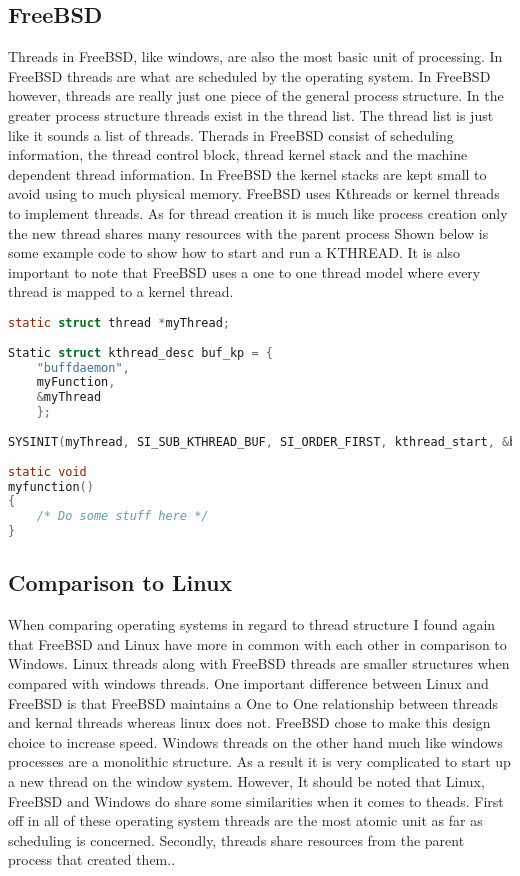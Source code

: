 \documentclass[letterpaper, onecolumn,10pt]{IEEEtran}
\begin{document}
			\subsection{FreeBSD}
			Threads in FreeBSD, like windows, are also the most basic unit of processing. In FreeBSD threads are what are scheduled by the operating system. In FreeBSD however, threads are really just one piece of the general process structure. In the greater process structure threads exist in the thread list. The thread list is just like it sounds a list of threads. Therads in FreeBSD consist of scheduling information, the thread control block, thread kernel stack and the machine dependent thread information. In FreeBSD the kernel stacks are kept small to avoid using to much physical memory. FreeBSD uses Kthreads or kernel threads to implement threads. As for thread creation it is much like process creation only the new thread shares many resources with the parent process Shown below is some example code to show how to start and run a KTHREAD\cite{FreeBsdMan}. It is also important to note that FreeBSD uses a one to one thread model where every thread is mapped to a kernel thread.\cite{FreeBSD}\\
			\newpage 
\begin{center}
\begin{lstlisting}[float, language=c]
static struct thread *myThread;
				
Static struct kthread_desc buf_kp = {
	"buffdaemon",
	myFunction,
	&myThread
	};
	
SYSINIT(myThread, SI_SUB_KTHREAD_BUF, SI_ORDER_FIRST, kthread_start, &buf_kp);
	
static void
myfunction()
{
	/* Do some stuff here */ 
}
\end{lstlisting}
\end{center}
			
			\subsection{Comparison to Linux}
			When comparing operating systems in regard to thread structure I found again that FreeBSD and Linux have more in common with each other in comparison to Windows. Linux threads along with FreeBSD threads are smaller structures when compared with windows threads. One important difference between Linux and FreeBSD is that FreeBSD maintains a One to One relationship between threads and kernal threads whereas linux does not. FreeBSD chose to make this design choice to increase speed. Windows threads on the other hand much like windows processes are a monolithic structure. As a result it is very complicated to start up a new thread on the window system. However, It should be noted that Linux, FreeBSD and Windows do share some similarities when it comes to theads. First off in all of these operating system threads are the most atomic unit as far as scheduling is concerned. Secondly, threads share resources from the parent process that created them.\cite{Windows}\cite{FreeBSD}\cite{Linux}.\\
			
\end{document}
